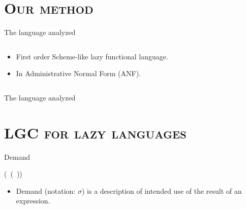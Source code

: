 \documentclass[xcolor=x11names,compress,mathserif]{beamer}
\renewcommand{\(}{\begin{columns}}
\renewcommand{\)}{\end{columns}}
\newcommand{\<}[1]{\begin{column}{#1}}
\renewcommand{\>}{\end{column}}
\begin{document}
\section{\scshape Our method}
\begin{frame}{The language analyzed}
\begin{columns}
  \begin{column}[T]{0.45\textwidth}
\small
    \begin{itemize} \itemsep0.75em
    \item First order Scheme-like lazy functional language.
    \item In Administrative Normal Form (ANF).
    \end{itemize}
\normalsize
  \end{column}
  \begin{column}[T]{0.55\textwidth}
    
  \end{column}
\end{columns}
\end{frame}
\begin{frame}{The language analyzed}
  
\end{frame}
\section{\scshape LGC for lazy languages}
\begin{frame}{Demand}
  \begin{center}
     (\CAR\ (\CDR\ \pw)) \\
  \end{center}
  \pause
\centerline{}
  \begin{itemize}
  \item Demand  (notation: $\sigma$) is a description  of intended use
    of the result of an expression.
  \end{itemize}
\end{frame}

\end{document}
